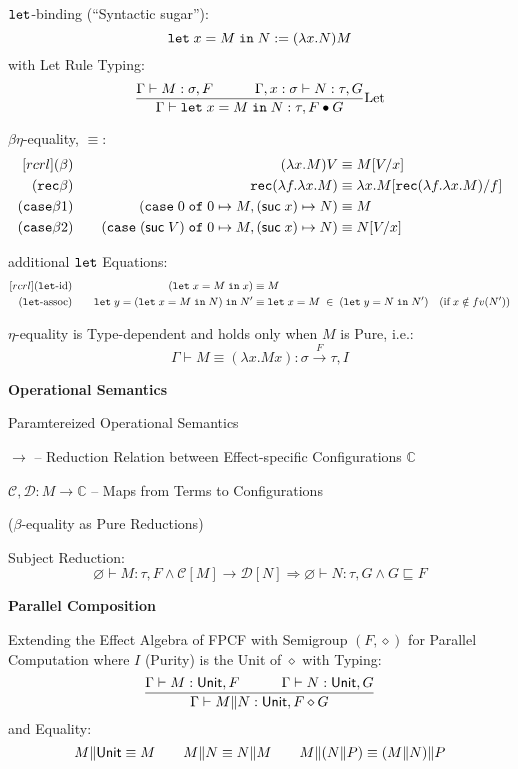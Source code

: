$\mathtt{let}$-binding (``Syntactic sugar''):
\[
  \mathtt{let}\; x = M \;\mathtt{in}\; N := (\lambda x.N) M
\]
with Let Rule Typing:
\[
  \frac{\Gamma \vdash M:\sigma,F \quad\quad\quad
    \Gamma,x:\sigma \vdash N:\tau,G}
  {\Gamma \vdash \mathtt{let}\; x = M \;\mathtt{in}\; N:\tau, F \bullet G}
  \mathrm{Let}
\]

$\beta\eta$-equality, $\equiv$:
\[
\begin{aligned}[r c r l]
  (\beta) & \quad & (\lambda x.M) V
    & \equiv M[V/x] \\
  (\rec\beta) & \quad & \rec(\lambda f.\lambda x.M)
    & \equiv \lambda x.M[\rec(\lambda f.\lambda x.M)/f] \\
  (\case\beta1) & \quad & (\case\; 0 \;\of\; 0 \mapsto M,
    (\suc\; x) \mapsto N) & \equiv M \\
  (\case\beta2) & \quad & (\case\; (\suc\; V) \;\of\; 0 \mapsto M,
    (\suc\; x) \mapsto N) & \equiv N[V/x] \\
\end{aligned}
\]

additional $\mathtt{let}$ Equations:
\[
\begin{aligned}[r c r l]
  (\lett\text{-id}) & \quad & (\lett\; x = M \;\inn\; x)
    & \equiv M \\
  (\lett\text{-assoc}) & \quad & \lett\; y =
      (\lett\; x = M \;\inn\; N) \;\inn\; N'
    & \equiv \lett\; x = M \;\in\; (\lett\; y = N \;\inn\; N')
      \quad (\text{if}\; x \notin fv(N'))\\
\end{aligned}
\]


$\eta$-equality is Type-dependent and holds only when $M$ is Pure,
i.e.:
\[
  \Gamma \vdash M \equiv (\lambda x.M x):\sigma \xrightarrow{F} \tau,I
\]


\textbf{Operational Semantics}

Paramtereized Operational Semantics

$\rightarrow$ -- Reduction Relation between Effect-specific
Configurations $\mathbb{C}$

$\mathcal{C},\mathcal{D} : M \rightarrow \mathbb{C}$ -- Maps from
Terms to Configurations

($\beta$-equality as Pure Reductions) %

Subject Reduction:
\[
  \varnothing \vdash M:\tau,F \wedge \mathcal{C}[M]
    \rightarrow \mathcal{D}[N]
  \Rightarrow \varnothing \vdash N:\tau,G \wedge G \sqsubseteq F
\]


\textbf{Parallel Composition}

Extending the Effect Algebra of FPCF with Semigroup $(F,\diamond)$ for
Parallel Computation where $I$ (Purity) is the Unit of $\diamond$ with
Typing:
\[
  \frac{\Gamma \vdash M:\mathsf{Unit},F \quad\quad\quad \Gamma \vdash N:\mathsf{Unit},G}
  {\Gamma \vdash M\|N:\mathsf{Unit},F \diamond G}
\]
and Equality:
\[
  M\|\mathsf{Unit} \equiv M \quad\quad M\|N \equiv N\|M
    \quad\quad M\|(N\|P) \equiv (M\|N)\|P
\]

